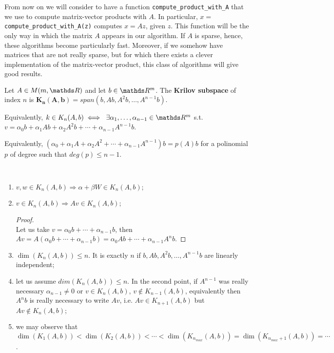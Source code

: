 \documentclass[ComputationalMathematics.tex]{subfiles}
\begin{document}
  From now on we will consider to have a function \texttt{compute\_product\_with\_A} that we use to compute matrix-vector products with $A$. In particular, $x=$\texttt{compute\_product\_with\_A(z)} computes $x =Az$, given $z$. This function will be the only way in which the matrix $A$ appears in our algorithm. If $A$ is sparse, hence, these algorithms become particularly fast. Moreover, if we somehow have matrices that are not really sparse, but for which there exists a clever implementation of the matrix-vector product, this class of algorithms will give good results.

\begin{definition}
  Let $A \in M(m, \R)$ and let $b \in \R^m$. The \textbf{Krilov subspace} of index $n$ is $\mathbf{K_n(A, b)} = span(b, Ab, A^2b, \ldots, A^{n-1}b)$.
  
  Equivalently, $k \in K_n(A, b) \iff ~ \exists \alpha_1, \ldots, \alpha_{n-1} \in \R^m$ s.t. $v= \alpha_0 b + \alpha_1 Ab + \alpha_2 A^2b + \cdots + \alpha_{n-1} A^{n-1}b$.
  
  Equivalently, $(\alpha_0 + \alpha_1A + \alpha_2A^2 + \cdots + \alpha_{n-1} A^{n-1}) b = p(A) b$ for a polinomial $p$ of degree such that $deg(p) \le n-1$.
\end{definition}

\begin{obs}[Properties]~\\
  \begin{enumerate}
    \item $v, w \in K_n(A, b) \Rightarrow \alpha + \beta W \in K_n(A, b)$;
    \item $v \in {K}_{n}(A, b) \Rightarrow Av \in {K}_{n}(A, b)$;
    \begin{proof}~\\ 
    Let us take $v = {\alpha}_{0} b + \cdots + {\alpha}_{n-1} b$, then $Av = A({\alpha}_{0} b + \cdots + {\alpha}_{n-1}b) = {\alpha}_0 Ab + \cdots + {\alpha}_{n-1} {A}^{n}b$.
    \end{proof}
    \item $\dim(K_n(A, b)) \le n$. It is exactly $n$ if $b, Ab, A^2 b, \ldots, A^{n-1} b$ are linearly independent;
    \item let us assume $dim(K_n(A, b)) \le n$. In the second point, if $A^{n-1}$ was really necessary ${\alpha}_{n-1} \neq 0$ or $v \in {K}_{n}(A, b)$, $v \notin {K}_{n-1}(A, b)$, equivalently then ${A}^{n}b$ is really necessary to write $Av$, i.e. $Av \in {K}_{n+1}(A, b)$ but $Av \notin {K}_{n}(A, b)$;
    \item we may observe that $\dim({K}_{1} (A, b)) < \dim({K}_{2}(A, b)) < \cdots < \dim({K}_{n_{max}}(A, b)) = \dim({K}_{n_{max} + 1}(A, b)) = \cdots$.
  \end{enumerate}
  \end{obs}
\end{document}

